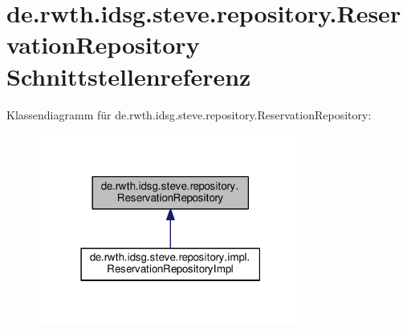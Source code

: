 \hypertarget{interfacede_1_1rwth_1_1idsg_1_1steve_1_1repository_1_1_reservation_repository}{\section{de.\+rwth.\+idsg.\+steve.\+repository.\+Reservation\+Repository Schnittstellenreferenz}
\label{interfacede_1_1rwth_1_1idsg_1_1steve_1_1repository_1_1_reservation_repository}
}


Klassendiagramm für de.\+rwth.\+idsg.\+steve.\+repository.\+Reservation\+Repository\+:\nopagebreak
\begin{figure}[H]
\begin{center}
\leavevmode
\includegraphics[width=247pt]{interfacede_1_1rwth_1_1idsg_1_1steve_1_1repository_1_1_reservation_repository__inherit__graph}
\end{center}
\end{figure}
